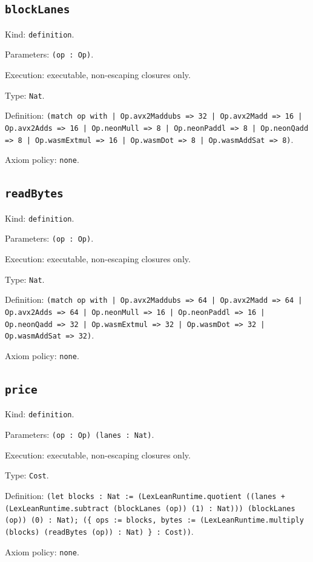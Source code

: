 \documentclass[11pt]{article}
\begin{document}
\subsection*{\texttt{blockLanes}}
\noindent Kind: \texttt{definition}.\par
\noindent Parameters: \texttt{(op : Op)}.\par
\noindent Execution: executable, non-escaping closures only.\par
\noindent Type: \texttt{Nat}.\par
\noindent Definition: \texttt{(match op with | Op.avx2Maddubs => 32 | Op.avx2Madd => 16 | Op.avx2Adds => 16 | Op.neonMull => 8 | Op.neonPaddl => 8 | Op.neonQadd => 8 | Op.wasmExtmul => 16 | Op.wasmDot => 8 | Op.wasmAddSat => 8)}.\par
\noindent Axiom policy: \texttt{none}.\par
\subsection*{\texttt{readBytes}}
\noindent Kind: \texttt{definition}.\par
\noindent Parameters: \texttt{(op : Op)}.\par
\noindent Execution: executable, non-escaping closures only.\par
\noindent Type: \texttt{Nat}.\par
\noindent Definition: \texttt{(match op with | Op.avx2Maddubs => 64 | Op.avx2Madd => 64 | Op.avx2Adds => 64 | Op.neonMull => 16 | Op.neonPaddl => 16 | Op.neonQadd => 32 | Op.wasmExtmul => 32 | Op.wasmDot => 32 | Op.wasmAddSat => 32)}.\par
\noindent Axiom policy: \texttt{none}.\par
\subsection*{\texttt{price}}
\noindent Kind: \texttt{definition}.\par
\noindent Parameters: \texttt{(op : Op) (lanes : Nat)}.\par
\noindent Execution: executable, non-escaping closures only.\par
\noindent Type: \texttt{Cost}.\par
\noindent Definition: \texttt{(let blocks : Nat := (LexLeanRuntime.quotient ((lanes + (LexLeanRuntime.subtract (blockLanes (op)) (1) : Nat))) (blockLanes (op)) (0) : Nat); (\{ ops := blocks, bytes := (LexLeanRuntime.multiply (blocks) (readBytes (op)) : Nat) \} : Cost))}.\par
\noindent Axiom policy: \texttt{none}.\par
\end{document}
